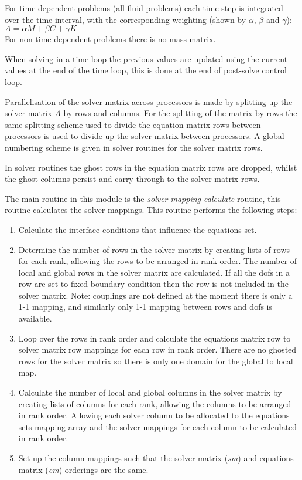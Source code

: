 For time dependent problems (all fluid problems) each time step is integrated 
over the time interval, with the corresponding weighting (shown by $\alpha$, 
$\beta$ and $\gamma$): $A=\alpha M + \beta C+ \gamma K$ \\
For non-time dependent problems there is no mass matrix.

When solving in a time loop the previous values are updated using the current
values at the end of the time loop, this is done at the end of post-solve
control loop.

Parallelisation of the solver matrix across processors is made by splitting up
the solver matrix $A$ by rows and columns. For the splitting of the matrix by
rows the same splitting scheme used to divide the equation matrix rows between
processors is used to divide up the solver matrix between processors. A global
numbering scheme is given in solver routines for the solver matrix rows.

In solver routines the ghost rows in the equation matrix rows are dropped, 
whilst the ghost columns persist and carry through to the solver matrix rows.

The main routine in this module is the \emph{solver mapping calculate} routine,
this routine calculates the solver mappings. This routine performs the 
following steps:

\begin{enumerate}
 \item Calculate the interface conditions that influence the equations set.
 \item Determine the number of rows in the solver matrix by creating lists of 
rows for each rank, allowing the rows to be arranged in rank order. The number 
of local and global rows in the solver matrix are calculated. If all the dofs 
in a row are set to fixed boundary condition then the row is not included in 
the solver matrix. Note: couplings are not defined at the moment there is only 
a 1-1 mapping, and similarly only 1-1 mapping between rows and dofs is 
available. 
 \item Loop over the rows in rank order and calculate the equations matrix row
to solver matrix row mappings for each row in rank order. There are no ghosted 
rows for the solver matrix so there is only one domain for the global to local 
map. 
 \item Calculate the number of local and global columns in the solver matrix by 
creating lists of columns for each rank, allowing the columns to be arranged in 
rank order. Allowing each solver column to be allocated to the equations sets 
mapping array and the solver mappings for each column to be calculated in rank 
order.
 \item Set up the column mappings such that the solver matrix (\emph{sm}) and 
equations matrix (\emph{em}) orderings are the same.
\end{enumerate}


